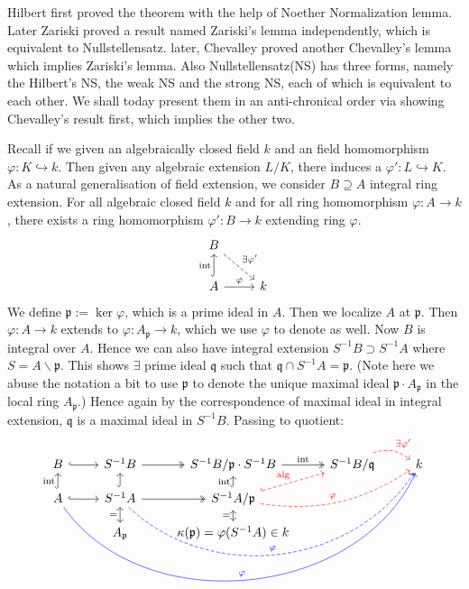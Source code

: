 \documentclass[12pt]{article}
\theoremstyle{definition}
\theoremstyle{plain}
\newcommand{\inj}{\hookrightarrow}
\begin{document}
\medskip
Hilbert first proved the theorem with the help of Noether Normalization lemma. Later Zariski proved a result named Zariski's lemma independently, which is equivalent to Nullstellensatz. later, Chevalley proved another Chevalley's lemma which implies Zariski's lemma. Also Nullstellensatz(NS) has three forms, namely the Hilbert's NS, the weak NS and the strong NS, each of which is equivalent to each other. We shall today present them in an anti-chronical order via showing Chevalley's result first, which implies the other two.

\medskip
Recall if we given an algebraically closed field $k$ and an field homomorphism $\varphi:K\inj k$. Then given any algebraic extension $L/K$, there induces a $\varphi':L\inj K$. As a natural generalisation of field extension, we consider $B\supseteq A$ integral ring extension.
\Prop For all algebraic closed field $k$ and for all ring homomorphism $\varphi: A\to k$, there exists a ring homomorphism $\varphi': B\to k$ extending ring $\varphi$.
\begin{equation}
  \begin{tikzcd}
    B\ar[dashed]{rd}{\exists \varphi'}\\
    A\uar[hook]{\text{int}}\rar{\varphi}&k
  \end{tikzcd}
\end{equation}
\proof We define $\mathfrak{p}:=\ker\varphi$, which is a prime ideal in $A$. Then we localize $A$ at $\mathfrak{p}$. Then $\varphi:A\to k$ extends to $\varphi: A_\mathfrak{p}\to k$, which we use $\varphi$ to denote as well. Now $B$ is integral over $A$. Hence we can also have integral extension $S^{-1}B\supset S^{-1}A$ where $S=A\backslash \mathfrak{p}$. This shows $\exists$ prime ideal $\mathfrak{q}$ such that $\mathfrak{q}\cap S^{-1}A=\mathfrak{p}$. (Note here we abuse the notation a bit to use $\mathfrak{p}$ to denote the unique maximal ideal $\mathfrak{p}\cdot A_\mathfrak{p}$ in the local ring $A_\mathfrak{p}$.) Hence again by the correspondence of maximal ideal in integral extension, $\mathfrak{q}$ is a maximal ideal in $S^{-1}B$. Passing to quotient:
\begin{equation}
  \begin{tikzcd}[row sep=small]
    B \rar[hook] &S^{-1}B \rar[two heads]&S^{-1}B/\mathfrak{p}\cdot S^{-1}B\rar[two heads]{\text{int}}&S^{-1}B/\mathfrak{q}\rar[bend left, dashed, red]{\exists \varphi'} &k\\
    A\ar[bend right=60,blue]{rrrru}{\varphi}\uar[hook]{\text{int}}\rar[hook]&S^{-1}A\ar[bend right=50, dashed, blue]{rrru}{\varphi}\rar[two heads]\uar[hook]&S^{-1}A/\mathfrak{p}\ar[bend right=20, dashed,red]{rru}{\varphi}\ar[hook, dashed, red]{ru}{\text{alg}}\uar[hook]{\text{int}}\\
    &A_\mathfrak{p}\arrow[<->]{u}{=} &\kappa(\mathfrak{p})=\varphi(S^{-1}A)\in k\arrow[<->]{u}{=}
  \end{tikzcd}
\end{equation}
\end{document}
